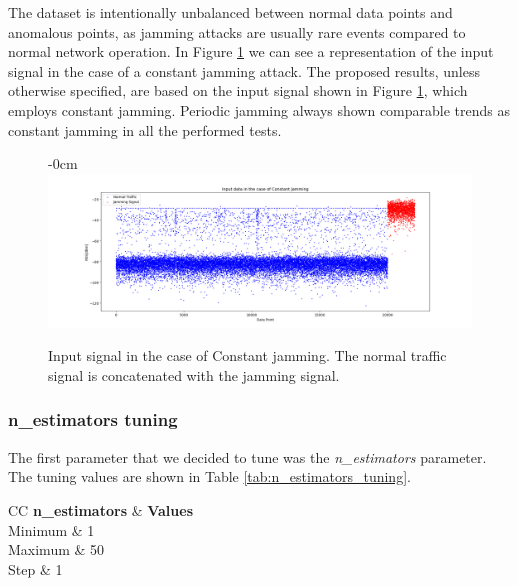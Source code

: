 \documentclass[futureinternet,article,submit,pdftex,moreauthors]{Definitions/mdpi}
\begin{document}
The dataset is intentionally unbalanced between normal data points and anomalous points, as jamming attacks are usually rare events compared to normal network operation. 
In Figure \ref{fig:InputSignal} we can see a representation of the input signal in the case of a constant jamming attack. The proposed results, unless otherwise specified, are based on the input signal shown in Figure \ref{fig:InputSignal}, which employs constant jamming. Periodic jamming always shown comparable trends as constant jamming in all the performed tests.


\begin{figure}[H]
    \begin{adjustwidth}{-\extralength}{0cm}
        \centering
        \includegraphics[width=21cm]{img/InputSignal.png}
    \end{adjustwidth}
    \caption{Input signal in the case of Constant jamming. The normal traffic signal is concatenated with the jamming signal.}
    \label{fig:InputSignal}
\end{figure}


\subsubsection{n\_estimators tuning}

The first parameter that we decided to tune was the \textit{n\_estimators} parameter. The tuning values are shown in Table \ref{tab:n_estimators_tuning}.

\begin{table}[H]
	\caption{n\_estimators tuning values.}\label{tab:n_estimators_tuning}
	\begin{tabularx}{\textwidth}{CC}
	\toprule
	\textbf{n\_estimators} & \textbf{Values} \\
	\midrule
	Minimum & 1 \\
	Maximum & 50 \\
	Step & 1 \\
	\bottomrule
\end{tabularx}
\end{table}
\end{document}
